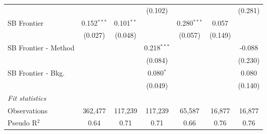\begin{tabular}{lcccccc}
                        &               &               & (0.102)       &               &         & (0.281)\\   
   SB Frontier          & 0.152$^{***}$ & 0.101$^{**}$  &               & 0.280$^{***}$ & 0.057   &   \\   
                        & (0.027)       & (0.048)       &               & (0.057)       & (0.149) &   \\   
   SB Frontier - Method &               &               & 0.218$^{***}$ &               &         & -0.088\\   
                        &               &               & (0.084)       &               &         & (0.230)\\   
   SB Frontier - Bkg.   &               &               & 0.080$^{*}$   &               &         & 0.080\\   
                        &               &               & (0.049)       &               &         & (0.140)\\   
   \midrule
   \emph{Fit statistics}\\
   Observations         & 362,477       & 117,239       & 117,239       & 65,587        & 16,877  & 16,877\\  
   Pseudo R$^2$         & 0.64          & 0.71          & 0.71          & 0.66          & 0.76    & 0.76\\  
   

\end{tabular}
